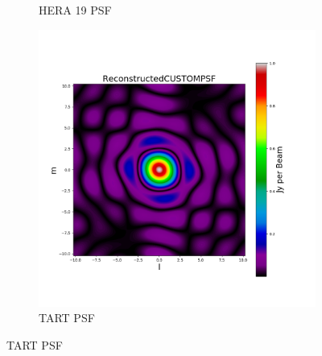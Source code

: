 \begin{figure}[htp]
\begin{subfigure}[b]{0.3\textwidth}
    \caption{HERA 19 PSF}
    \label{fig:2}
  \end{subfigure}
  \begin{subfigure}[b]{0.3\textwidth}
    \includegraphics[width=\textwidth]{images/TART_PSF.png}
    \caption{TART PSF}
    \label{fig:2}
  \end{subfigure}
\end{figure}
